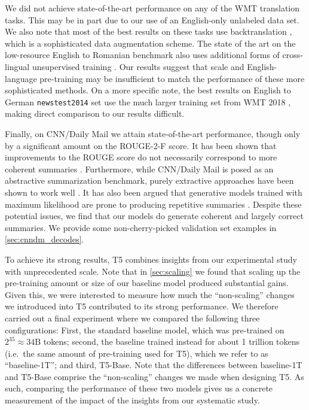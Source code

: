 \documentclass[twoside,11pt]{article}
\begin{document}
We did not achieve state-of-the-art performance on any of the WMT translation tasks.
This may be in part due to our use of an English-only unlabeled data set.
We also note that most of the best results on these tasks use backtranslation \citep{edunov2018understanding,lample2019cross}, which is a sophisticated data augmentation scheme.
The state of the art on the low-resource English to Romanian benchmark also uses additional forms of cross-lingual unsupervised training \citep{lample2019cross}.
Our results suggest that scale and English-language pre-training may be insufficient to match the performance of these more sophisticated methods.
On a more specific note, the best results on English to German \texttt{newstest2014} set use the much larger training set from WMT 2018 \citep{edunov2018understanding}, making direct comparison to our results difficult.

Finally, on CNN/Daily Mail we attain state-of-the-art performance, though only by a significant amount on the ROUGE-2-F score.
It has been shown that improvements to the ROUGE score do not necessarily correspond to more coherent summaries \citep{paulus2017deep}.
Furthermore, while CNN/Daily Mail is posed as an abstractive summarization benchmark, purely extractive approaches have been shown to work well \citep{liu2019fine}.
It has also been argued that generative models trained with maximum likelihood are prone to producing repetitive summaries \citep{see2017get}.
Despite these potential issues, we find that our models do generate coherent and largely correct summaries.
We provide some non-cherry-picked validation set examples in \cref{sec:cnndm_decodes}.

To achieve its strong results, T5 combines insights from our experimental study with unprecedented scale.
Note that in \cref{sec:scaling} we found that scaling up the pre-training amount or size of our baseline model produced substantial gains.
Given this, we were interested to measure how much the ``non-scaling'' changes we introduced into T5 contributed to its strong performance.
We therefore carried out a final experiment where we compared the following three configurations:
First, the standard baseline model, which was pre-trained on $2^{35} \approx 34\mathrm{B}$ tokens;
second, the baseline trained instead for about 1 trillion tokens (i.e.\ the same amount of pre-training used for T5), which we refer to as ``baseline-1T'';
and third, T5-Base.
Note that the differences between baseline-1T and T5-Base comprise the ``non-scaling'' changes we made when designing T5.
As such, comparing the performance of these two models gives us a concrete measurement of the impact of the insights from our systematic study.
\end{document}
